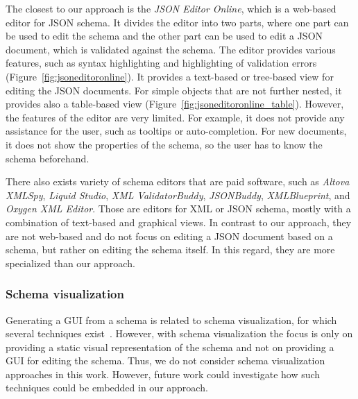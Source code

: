 The closest to our approach is the \textit{JSON Editor Online}\cite{jsoneditoronlineJSONEditor}, which is a web-based editor for JSON schema.
It divides the editor into two parts, where one part can be used to edit the schema and the other part can be used to edit a JSON document,
which is validated against the schema.
The editor provides various features, such as syntax highlighting and highlighting of validation errors (Figure~\ref{fig:jsoneditoronline}).
It provides a text-based or tree-based view for editing the JSON documents.
For simple objects that are not further nested, it provides also a table-based view (Figure~\ref{fig:jsoneditoronline_table}).
However, the features of the editor are very limited.
For example, it does not provide any assistance for the user, such as tooltips or auto-completion.
For new documents, it does not show the properties of the schema, so the user has to know the schema beforehand.

There also exists variety of schema editors that are paid software, such as \textit{Altova XMLSpy}\cite{altovaEditorXMLSpy},
\textit{Liquid Studio}\cite{liquidtechnologiesJSONSchema}, \textit{XML ValidatorBuddy}\cite{xmlbuddyEditorValidator},
\textit{JSONBuddy}\cite{jsonbuddyJSONSchema}, \textit{XMLBlueprint}\cite{xmlblueprintEditorXMLBlueprint},
and \textit{Oxygen XML Editor}\cite{oxygenxmlCompleteSolution}.
Those are editors for XML or JSON schema, mostly with a combination of text-based and graphical views.
In contrast to our approach, they are not web-based and do not focus on editing a JSON document based on a schema,
but rather on editing the schema itself.
In this regard, they are more specialized than our approach.

\subsubsection{Schema visualization}\label{subsubsec:schema-visualization}
Generating a GUI from a schema is related to schema visualization, for which several techniques exist~\cite{Frasincar2006, SILVA201928, 10.1145/1317353.1317362, 1173142}.
However, with schema visualization the focus is only on providing a static visual representation of the schema
and not on providing a GUI for editing the schema.
Thus, we do not consider schema visualization approaches in this work.
However, future work could investigate how such techniques could be embedded in our approach.

